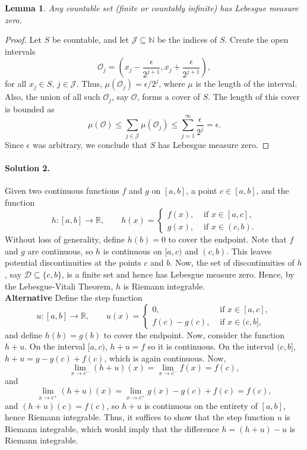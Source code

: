 \documentclass[10pt]{article}
\def\R{\mathbb{R}}
\def\N{\mathbb{N}}
\newtheorem{lemma}[theorem]{Lemma}
\begin{document}
    \begin{lemma}
        Any countable set (finite or countably infinite) has Lebesgue measure zero.
    \end{lemma}
    \begin{proof}
        Let $S$ be countable, and let $\mathscr{J} \subseteq \N$ be the
        indices of $S$. Create the open intervals \[
            \mathscr{O}_j = \left(x_j - \frac{\epsilon}{2^{j + 1}}, x_j +
            \frac{\epsilon}{2^{j + 1}}\right),
        \] for all $x_j \in S$, $j \in \mathscr{J}$. Thus, $\mu(\mathscr{O}_j) =
        \epsilon / 2^{j}$, where $\mu$ is the length of the interval. Also, the
        union of all such $\mathscr{O}_j$, say $\mathscr{O}$, forms a cover of $S$.
        The length of this cover is bounded as \[
            \mu\left(\mathscr{O}\right) \leq \sum_{j \in \mathscr{J}}
            \mu(\mathscr{O}_j) \leq \sum_{j = 1}^\infty \frac{\epsilon}{2^j} =
            \epsilon.
        \] Since $\epsilon$ was arbitrary, we conclude that $S$ has
        Lebesgue measure zero.
    \end{proof}

    \paragraph{Solution 2.}
    Given two continuous functions $f$ and $g$ on $[a, b]$, a point $c \in [a, b]$,
    and the function \[
        h\colon [a, b] \to \R, \qquad h(x) = \begin{cases}
            f(x), &\text{ if }x \in [a, c], \\
            g(x), &\text{ if }x \in (c, b).
        \end{cases}
    \] Without loss of generality, define $h(b) = 0$ to cover the endpoint.
    Note that $f$ and $g$ are continuous, so $h$ is continuous on $[a, c)$ and $(c,
    b)$. This leaves potential discontinuities at the points $c$ and $b$. 
    Now, the set of discontinuities of $h$, say $\mathscr{D} \subseteq \{c, b\}$, is
    a finite set and hence has Lebesgue measure zero. Hence, by the Lebesgue-Vitali
    Theorem, $h$ is Riemann integrable. \\

    \textbf{Alternative} Define the step function \[
        u\colon[a, b] \to \R, \qquad u(x) = \begin{cases}
            0, &\text{ if }x \in [a, c], \\
            f(c) - g(c), &\text{ if }x \in (c, b],
        \end{cases}
    \] and define $h(b) = g(b)$ to cover the endpoint. Now, consider the function $h
    + u$. On the interval $[a, c)$, $h + u = f$ so it is continuous. On the interval
    $(c, b]$, $h + u = g - g(c) + f(c)$, which is again continuous. Now, \[
        \lim_{x \to c^-}(h + u)(x) = \lim_{x \to c^-} f(x) = f(c), 
    \] and \[
        \lim_{x \to c^+}(h + u)(x) = \lim_{x \to c^+} g(x) - g(c) + f(c) = f(c),
    \] and $(h + u)(c) = f(c)$, so $h + u$ is continuous on the entirety of $[a,
    b]$, hence Riemann integrable. Thus, it suffices to show that the step function
    $u$ is Riemann integrable, which would imply that the difference $h = (h + u) -
    u$ is Riemann integrable. \\
\end{document}
